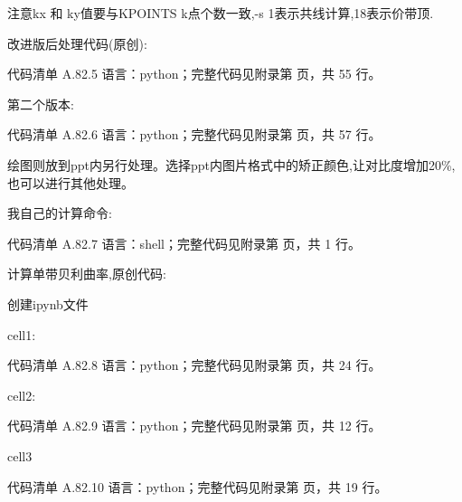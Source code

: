 \documentclass[lang=cn,scheme=chinese,color=blue,device=normal,toc=onecol,math=cm]{elegantbook}
\begin{document}
注意kx 和 ky值要与KPOINTS k点个数一致,-s 1表示共线计算,18表示价带顶.\par


改进版后处理代码(原创):\par


\begin{codeindexbox}{代码清单 A.82.5}
语言：python；完整代码见附录第 \pageref{code:82:5} 页，共 55 行。
\end{codeindexbox}


第二个版本:\par


\begin{codeindexbox}{代码清单 A.82.6}
语言：python；完整代码见附录第 \pageref{code:82:6} 页，共 57 行。
\end{codeindexbox}


绘图则放到ppt内另行处理。选择ppt内图片格式中的矫正颜色,让对比度增加20\%,也可以进行其他处理。\par


我自己的计算命令:\par


\begin{codeindexbox}{代码清单 A.82.7}
语言：shell；完整代码见附录第 \pageref{code:82:7} 页，共 1 行。
\end{codeindexbox}


计算单带贝利曲率,原创代码:\par


创建ipynb文件\par


cell1:\par


\begin{codeindexbox}{代码清单 A.82.8}
语言：python；完整代码见附录第 \pageref{code:82:8} 页，共 24 行。
\end{codeindexbox}


cell2:\par


\begin{codeindexbox}{代码清单 A.82.9}
语言：python；完整代码见附录第 \pageref{code:82:9} 页，共 12 行。
\end{codeindexbox}


cell3\par


\begin{codeindexbox}{代码清单 A.82.10}
语言：python；完整代码见附录第 \pageref{code:82:10} 页，共 19 行。
\end{codeindexbox}
\end{document}
